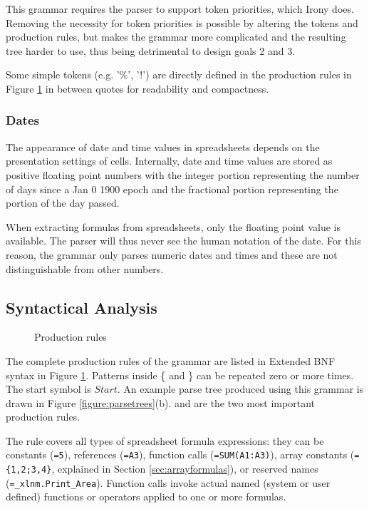 This grammar requires the parser to support token priorities, which Irony does.
Removing the necessity for token priorities is possible by altering the tokens and production rules, but makes the grammar more complicated and the resulting tree harder to use, thus being detrimental to design goals 2 and 3.

Some simple tokens (e.g. '\%', '!') are directly defined in the production rules in Figure \ref{figure:productions} in between quotes for readability and compactness.

\subsubsection{\textbf{Dates}}

The appearance of date and time values in spreadsheets depends on the presentation settings of cells. Internally, date and time values are stored as positive floating point numbers with the integer portion representing the number of days since a Jan 0 1900 epoch and the fractional portion representing the portion of the day passed.

When extracting formulas from spreadsheets, only the floating point value is available.
The parser will thus never see the human notation of the date.
For this reason, the grammar only parses numeric dates and times and these are not distinguishable from other numbers.



\subsection{Syntactical Analysis}

\begin{figure}
\small
\caption{Production rules}
\label{figure:productions}
\begin{multicols*}{2}

\end{multicols*}
\end{figure}

The complete production rules of the grammar are listed in Extended BNF syntax in Figure \ref{figure:productions}.
Patterns inside \{ and \} can be repeated zero or more times.
The start symbol is $Start$. An example parse tree produced using this grammar is drawn in Figure \ref{figure:parsetrees}(b).
 and  are the two most important production rules.

The  rule covers all types of spreadsheet formula expressions: they can be constants (\texttt{=5}), references (\texttt{=A3}), function calls (\texttt{=SUM(A1:A3)}), array constants (\texttt{=\{1,2;3,4\}}, explained in Section \ref{sec:arrayformulas}), or reserved names (\texttt{=_xlnm.Print_Area}). Function calls invoke actual named (system or user defined) functions or operators applied to one or more formulas.

